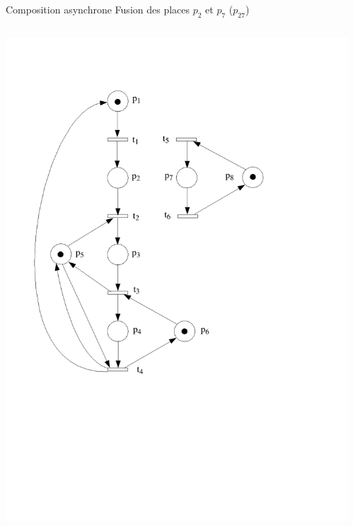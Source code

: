 \documentclass[compress]{beamer}
\begin{document}
\begin{frame}{Composition asynchrone}
Fusion des places $p_2$ et $p_7$ ($p_{27}$)
\begin{columns}
\begin{column}{.5\linewidth}
	\centering
	\includegraphics[width=\linewidth]{exempleb}
\end{column}
\begin{column}{.5\linewidth}
	\centering

\end{column}
\end{columns}
\end{frame}
\end{document}
